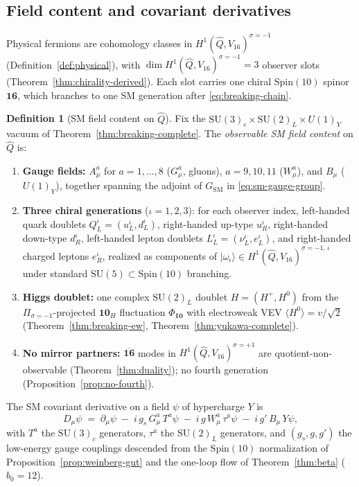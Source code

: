 \documentclass[aps,prd,onecolumn,amsmath,amssymb,nofootinbib,11pt]{revtex4-2}
\numberwithin{equation}{section}
\theoremstyle{plain}
\theoremstyle{definition}
\newtheorem{definition}[theorem]{Definition}
\theoremstyle{remark}
\newcommand{\Spin}{\mathrm{Spin}}
\begin{document}
\subsection{Field content and covariant derivatives}
\label{sec:sm-lagrangian:fields}

Physical fermions are cohomology classes in
$H^1(\hat Q,V_{16})^{\sigma=-1}$ (Definition~\ref{def:physical}), with
$\dim H^1(\hat Q,V_{16})^{\sigma=-1}=3$ observer slots
(Theorem~\ref{thm:chirality-derived}). Each slot carries one chiral
$\Spin(10)$ spinor $\mathbf{16}$, which branches to one SM generation after
\eqref{eq:breaking-chain}.

\begin{definition}[SM field content on $\hat Q$]\label{def:sm-fields}
Fix the $\mathrm{SU}(3)_c\times\mathrm{SU}(2)_L\times U(1)_Y$ vacuum of
Theorem~\ref{thm:breaking-complete}. The \emph{observable SM field content}
on $\hat Q$ is:
\begin{enumerate}[label=\textbf{(\arabic*)},leftmargin=*]
  \item \textbf{Gauge fields:} $A_\mu^a$ for $a=1,\ldots,8$ ($G_\mu^a$, gluons),
    $a=9,10,11$ ($W_\mu^a$), and $B_\mu$ ($U(1)_Y$), together spanning the
    adjoint of $G_{\mathrm{SM}}$ in \eqref{eq:sm-gauge-group}.
  \item \textbf{Three chiral generations} ($\iota=1,2,3$): for each observer
    index, left-handed quark doublets $Q_L^\iota=(u_L^\iota,d_L^\iota)$,
    right-handed up-type $u_R^\iota$, right-handed down-type $d_R^\iota$,
    left-handed lepton doublets $L_L^\iota=(\nu_L^\iota,e_L^\iota)$, and
    right-handed charged leptons $e_R^\iota$, realized as components of
    $|\omega_\iota\rangle\in H^1(\hat Q,V_{16})^{\sigma=-1,\,\iota}$
    under standard $\mathrm{SU}(5)\subset\Spin(10)$ branching.
  \item \textbf{Higgs doublet:} one complex $\mathrm{SU}(2)_L$ doublet
    $H=(H^+,H^0)$ from the $\Pi_{\sigma=-1}$-projected $\mathbf{10}_H$
    fluctuation $\Phi_{\mathbf{10}}$ with electroweak VEV
    $\langle H^0\rangle=v/\sqrt{2}$ (Theorem~\ref{thm:breaking-ew},
    Theorem~\ref{thm:yukawa-complete}).
  \item \textbf{No mirror partners:} $\overline{\mathbf{16}}$ modes in
    $H^1(\hat Q,V_{16})^{\sigma=+1}$ are quotient-non-observable
    (Theorem~\ref{thm:duality}); no fourth generation
    (Proposition~\ref{prop:no-fourth}).
\end{enumerate}
The SM covariant derivative on a field $\psi$ of hypercharge $Y$ is
\begin{equation}\label{eq:sm-covariant}
  D_\mu\psi
  \;=\;
  \partial_\mu\psi
  \;-\;
  i\,g_s\,G_\mu^a\,T^a\psi
  \;-\;
  i\,g\,W_\mu^a\,\tau^a\psi
  \;-\;
  i\,g'\,B_\mu\,Y\psi,
\end{equation}
with $T^a$ the $\mathrm{SU}(3)_c$ generators, $\tau^a$ the $\mathrm{SU}(2)_L$
generators, and $(g_s,g,g')$ the low-energy gauge couplings descended from the
$\Spin(10)$ normalization of Proposition~\ref{prop:weinberg-gut} and the
one-loop flow of Theorem~\ref{thm:beta} ($b_0=12$).
\end{definition}
\end{document}
